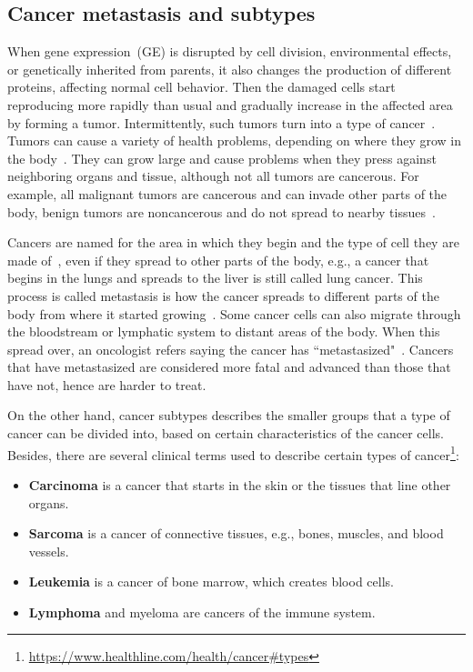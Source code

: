 \subsection{Cancer metastasis and subtypes}
When gene expression~(GE) is disrupted by cell division, environmental effects, or genetically inherited from parents, it also changes the production of different proteins, affecting normal cell behavior. Then the damaged cells start reproducing more rapidly than usual and gradually increase in the affected area by forming a tumor. Intermittently, such tumors turn into a type of cancer~\cite{zuo2019identification,24Podolsky}. Tumors can cause a variety of health problems, depending on where they grow in the body~\cite{zuo2019identification}. They can grow large and cause problems when they press against neighboring organs and tissue, although not all tumors are cancerous. For example, all malignant tumors are cancerous and can invade other parts of the body, benign tumors are noncancerous and do not spread to nearby tissues~\cite{13cancerdef}. 

\hspace*{3.5mm} Cancers are named for the area in which they begin and the type of cell they are made of~\cite{19Cruz}, even if they spread to other parts of the body, e.g., a cancer that begins in the lungs and spreads to the liver is still called lung cancer. This process is called metastasis is how the cancer spreads to  different parts of the body from where it started growing~\cite{13cancerdef}. Some cancer cells can also migrate through the bloodstream or lymphatic system to distant areas of the body. When this spread over, an oncologist refers saying the cancer has ``metastasized"~\cite{22Ding}. Cancers that have metastasized are considered more fatal and advanced than those that have not, hence are harder to treat. 

\hspace*{3.5mm} On the other hand, cancer subtypes describes the smaller groups that a type of cancer can be divided into, based on certain characteristics of the cancer cells. Besides, there are several clinical terms used to describe certain types of cancer\footnote{\url{https://www.healthline.com/health/cancer\#types}}:

\vspace{-2mm}
\begin{itemize}[noitemsep]
    \item \textbf{Carcinoma} is a cancer that starts in the skin or the tissues that line other organs.
    \item \textbf{Sarcoma} is a cancer of connective tissues, e.g., bones, muscles, and blood vessels.
    \item \textbf{Leukemia} is a cancer of bone marrow, which creates blood cells.
    \item \textbf{Lymphoma} and myeloma are cancers of the immune system.
\end{itemize} 
\vspace{-2mm}

